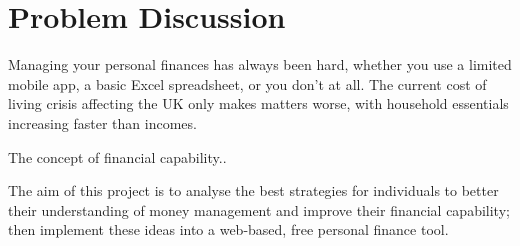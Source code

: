 \section{Problem Discussion}
Managing your personal finances has always been hard, whether you use a limited mobile app, a basic Excel spreadsheet, or you don't at all. The current cost of living crisis affecting the UK only makes matters worse, with household essentials increasing faster than incomes.  

The concept of financial capability..

The aim of this project is to analyse the best strategies for individuals to better their understanding of money management and improve their financial capability; then implement these ideas into a web-based, free personal finance tool.